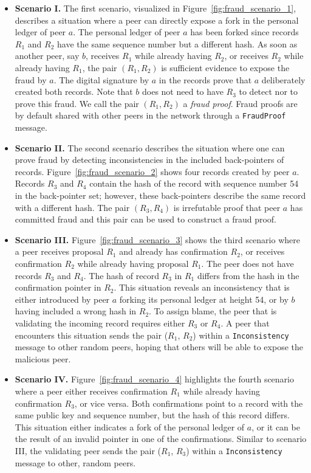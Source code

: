 \begin{itemize}
	\item \textbf{Scenario I.}
	The first scenario, visualized in Figure~\ref{fig:fraud_scenario_1}, describes a situation where a peer can directly expose a fork in the personal ledger of peer $ a $.
	The personal ledger of peer $ a $ has been forked since records $ R_1 $ and $ R_2 $ have the same sequence number but a different hash.
	As soon as another peer, say $ b $, receives $ R_1 $ while already having $ R_2 $, or receives $ R_2 $ while already having $ R_1 $, the pair $ (R_1, R_2) $ is sufficient evidence to expose the fraud by $ a $.
	The digital signature by $ a $ in the records prove that $ a $ deliberately created both records.
	Note that $ b $ does not need to have $ R_3 $ to detect nor to prove this fraud.
	We call the pair $ (R_1, R_2) $ a \emph{fraud proof}.
	Fraud proofs are by default shared with other peers in the network through a \texttt{FraudProof} message.
	\item \textbf{Scenario II.} The second scenario describes the situation where one can prove fraud by detecting inconsistencies in the included back-pointers of records.
	Figure~\ref{fig:fraud_scenario_2} shows four records created by peer $ a $.
	Records $ R_3 $ and $ R_4 $ contain the hash of the record with sequence number 54 in the back-pointer set; however, these back-pointers describe the same record with a different hash.
	The pair $ (R_3, R_4) $ is irrefutable proof that peer $ a $ has committed fraud and this pair can be used to construct a fraud proof.
	\item \textbf{Scenario III.}
	Figure~\ref{fig:fraud_scenario_3} shows the third scenario where a peer receives proposal $ R_1 $ and already has confirmation $ R_2 $, or receives confirmation $ R_2 $ while already having proposal $ R_1 $.
	The peer does not have records $ R_3 $ and $ R_4 $.
	The hash of record $ R_3 $ in $ R_1 $ differs from the hash in the confirmation pointer in $ R_2 $.
	This situation reveals an inconsistency that is either introduced by peer $ a $ forking its personal ledger at height 54, or by $ b $ having included a wrong hash in $ R_2 $.
	To assign blame, the peer that is validating the incoming record requires either $ R_3 $ or $ R_4 $.
	A peer that encounters this situation sends the pair ($ R_1 $, $ R_2 $) within a \texttt{Inconsistency} message to other random peers, hoping that others will be able to expose the malicious peer.
	\item \textbf{Scenario IV.}
	Figure~\ref{fig:fraud_scenario_4} highlights the fourth scenario where a peer either receives confirmation $ R_1 $ while already having confirmation $ R_3 $, or vice versa.
	Both confirmations point to a record with the same public key and sequence number, but the hash of this record differs.
	This situation either indicates a fork of the personal ledger of $ a $, or it can be the result of an invalid pointer in one of the confirmations.
	Similar to scenario III, the validating peer sends the pair ($ R_1 $, $ R_3 $) within a \texttt{Inconsistency} message to other, random peers.
\end{itemize}

